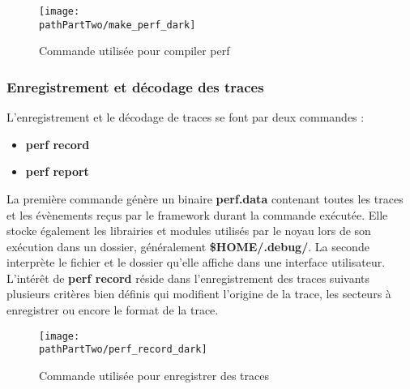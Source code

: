 \begin{figure}[H]
	\begin{center}
		\texttt{[image: \\pathPartTwo/make\_perf\_dark]}
		\caption{Commande utilisée pour compiler perf}
            \label{cmd:perf_compilation}
	\end{center}
\end{figure}

\subsubsection{Enregistrement et décodage des traces}

L'enregistrement et le décodage de traces se font par deux commandes :

\begin{itemize}[label=\textbullet]
	\item \textbf{perf record}
	\item \textbf{perf report}
\end{itemize}

La première commande génère un binaire \textbf{perf.data} contenant toutes les
traces et les évènements reçus par le framework durant la commande exécutée.
Elle stocke également les librairies et modules utilisés par le noyau lors de
son exécution dans un dossier, généralement \textbf{\$HOME/.debug/}. La
seconde interprète le fichier et le dossier qu'elle affiche dans une interface
utilisateur. \\

L'intérêt de \textbf{perf record} réside dans l'enregistrement des traces
suivants plusieurs critères bien définis qui modifient l'origine de la trace,
les secteurs à enregistrer ou encore le format de la trace. 

\begin{figure}[H]
	\begin{center}
		\texttt{[image: \\pathPartTwo/perf\_record\_dark]}
		\caption{Commande utilisée pour enregistrer des traces}
            \label{cmd:perf_record_cs_etm}
	\end{center}
\end{figure}

